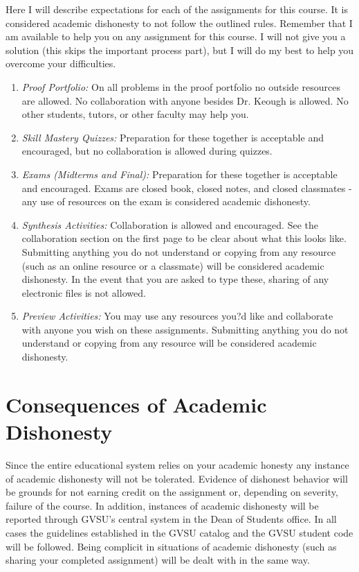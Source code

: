 \documentclass[12pt]{article}
\begin{document}
Here I will describe expectations for each of the assignments for this course. It is considered academic dishonesty to not follow the outlined rules.  Remember that I am available to help you on any assignment for this course.  I will not give you a solution (this skips the important process part), but I will do my best to help you overcome your difficulties.

\begin{enumerate}
\item \emph{Proof Portfolio:}  On all problems in the proof portfolio no outside resources are allowed.  No collaboration with anyone besides Dr. Keough is allowed. No other students, tutors, or other faculty may help you.

\item \emph{Skill Mastery Quizzes:}  Preparation for these together is acceptable and encouraged, but no collaboration is allowed during quizzes.

\item \emph{Exams (Midterms and Final):} Preparation for these together is acceptable and encouraged. Exams are closed book, closed notes, and closed classmates - any use of resources on the exam is considered academic dishonesty. 


\item \emph{Synthesis Activities:}  Collaboration is allowed and encouraged. See the collaboration section on the first page to be clear about what this looks like. Submitting anything you do not understand or copying from any resource (such as an online resource or a classmate) will be considered academic dishonesty. In the event that you are asked to type these, sharing of any electronic files is not allowed.


\item \emph{Preview Activities:}  You may use any resources you?d like and collaborate with anyone you wish on these assignments. Submitting anything you do not understand or copying from any resource will be considered academic dishonesty.





\end{enumerate}

\section*{Consequences of Academic Dishonesty}

Since the entire educational system relies on your academic honesty any instance of academic dishonesty will not be tolerated.  Evidence of dishonest behavior will be grounds for not earning credit on the assignment or, depending on severity, failure of the course.  In addition, instances of academic dishonesty will be reported through GVSU's central system in the Dean of Students office.  In all cases the guidelines established in the GVSU catalog and the GVSU student code will be followed.  Being complicit in situations of academic dishonesty (such as sharing your completed assignment)  will be dealt with in the same way.\\
\end{document}
